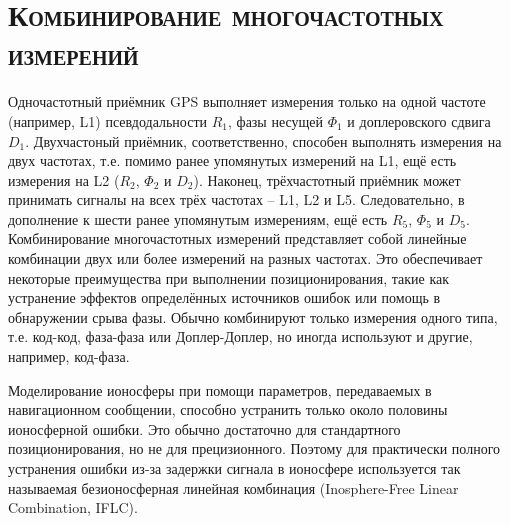 \section{\textsc{Комбинирование многочастотных измерений}}

Одночастотный приёмник GPS выполняет измерения только на одной частоте (например, L1) псевдодальности $R_1$, фазы несущей $\Phi_1$ и доплеровского сдвига $D_1$.
Двухчастоный приёмник, соответственно, способен выполнять измерения на двух частотах, т.е. помимо ранее упомянутых измерений на L1, ещё есть измерения на L2 ($R_2$, $\Phi_2$ и $D_2$).
Наконец, трёхчастотный приёмник может принимать сигналы на всех трёх частотах -- L1, L2 и L5. 
Следовательно, в дополнение к шести ранее упомянутым измерениям, ещё есть $R_5$, $\Phi_5$ и $D_5$. 
Комбинирование многочастотных измерений представляет собой линейные комбинации двух или более измерений на разных частотах.
Это обеспечивает некоторые преимущества при выполнении позиционирования, такие как устранение эффектов определённых источников ошибок или помощь в обнаружении срыва фазы. 
Обычно комбинируют только измерения одного типа, т.е. код-код, фаза-фаза или Доплер-Доплер, но иногда используют и другие, например, код-фаза. 

Моделирование ионосферы при помощи параметров, передаваемых в навигационном сообщении, способно устранить только около половины ионосферной ошибки.
Это обычно достаточно для стандартного позиционирования, но не для прецизионного.
Поэтому для практически полного устранения ошибки из-за задержки сигнала в ионосфере используется так называемая безионосферная линейная комбинация (Inosphere-Free Linear Combination, IFLC).

